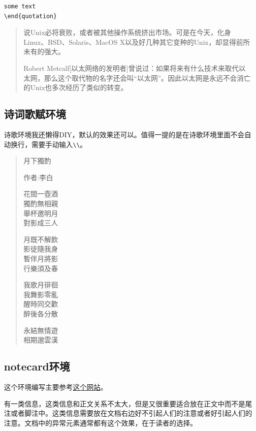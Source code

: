 \documentclass[12pt,oneside]{book}
\begin{document}
\begin{common-format}
\begin{Verbatim}
some text
\end{quotation}
\end{Verbatim}


\begin{quotation}
说Unix必将衰败，或者被其他操作系统挤出市场。可是在今天，化身Linux、BSD、Solaris、MacOS X以及好几种其它变种的Unix，却显得前所未有的强大。

Robert Metcalf[以太网络的发明者]曾说过：如果将来有什么技术来取代以太网，那么这个取代物的名字还会叫“以太网”。因此以太网是永远不会消亡的Unix也多次经历了类似的转变。
\end{quotation}



\subsection{诗词歌赋环境}
诗歌环境我还懒得DIY，默认的效果还可以。值得一提的是在诗歌环境里面不会自动换行，需要手动输入\verb+\\+。

\begin{verse}
\centering\noindent
月下獨酌

作者:李白

花間一壺酒\\
獨酌無相親\\
舉杯邀明月\\
對影成三人

月既不解飲\\
影徒隨我身\\
暫伴月將影\\
行樂須及春

我歌月徘徊\\
我舞影零亂\\
醒時同交歡\\
醉後各分散

永結無情遊\\
相期邈雲漢
\end{verse}


\subsection{notecard环境}
这个环境编写主要参考\href{http://tex.stackexchange.com/questions/127612/color-text-and-bg-of-verbatim-without-affecting-fancyvrb-line-numbers}{这个网站}。

有一类信息，这类信息和正文关系不太大，但是又很重要适合放在正文中而不是尾注或者脚注中。这类信息需要放在文档右边好不引起人们的注意或者好引起人们的注意。文档中的异常元素通常都有这个效果，在于读者的选择。


\end{common-format}
\end{document}
